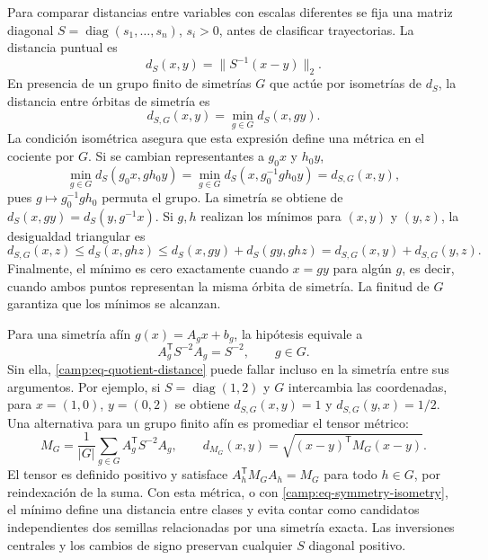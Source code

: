 Para comparar distancias entre variables con escalas diferentes se fija una
matriz diagonal \(S=\operatorname{diag}(s_1,\ldots,s_n)\), \(s_i>0\), antes de
clasificar trayectorias. La distancia puntual es
\begin{equation}
 d_S(x,y)=\lVert S^{-1}(x-y)\rVert_2.
 \label{camp:eq-scaled-distance}
\end{equation}
En presencia de un grupo finito de simetrías \(G\) que actúe por isometrías
de \(d_S\), la distancia entre órbitas de simetría es
\begin{equation}
 d_{S,G}(x,y)=\min_{g\in G}d_S(x,g y).
 \label{camp:eq-quotient-distance}
\end{equation}
La condición isométrica asegura que esta expresión define una métrica en el
cociente por \(G\). Si se cambian representantes a \(g_0x\) y \(h_0y\),
\[
 \min_{g\in G}d_S(g_0x,gh_0y)
 =\min_{g\in G}d_S(x,g_0^{-1}gh_0y)=d_{S,G}(x,y),
\]
pues \(g\mapsto g_0^{-1}gh_0\) permuta el grupo. La simetría se obtiene de
\(d_S(x,gy)=d_S(y,g^{-1}x)\). Si \(g,h\) realizan los mínimos para
\((x,y)\) y \((y,z)\), la desigualdad triangular es
\[
 d_{S,G}(x,z)\leq d_S(x,ghz)
 \leq d_S(x,gy)+d_S(gy,ghz)
 =d_{S,G}(x,y)+d_{S,G}(y,z).
\]
Finalmente, el mínimo es cero exactamente cuando \(x=gy\) para algún
\(g\), es decir, cuando ambos puntos representan la misma órbita de simetría.
La finitud de \(G\) garantiza que los mínimos se alcanzan.

Para una simetría afín \(g(x)=A_gx+b_g\), la hipótesis equivale a
\begin{equation}
 A_g^{\mathsf T}S^{-2}A_g=S^{-2},\qquad g\in G.
 \label{camp:eq-symmetry-isometry}
\end{equation}
Sin ella, \cref{camp:eq-quotient-distance} puede fallar incluso en la
simetría entre sus argumentos. Por ejemplo, si \(S=\operatorname{diag}(1,2)\)
y \(G\) intercambia las coordenadas, para \(x=(1,0)\), \(y=(0,2)\) se obtiene
\(d_{S,G}(x,y)=1\) y \(d_{S,G}(y,x)=1/2\). Una alternativa para un grupo
finito afín es promediar el tensor métrico:
\begin{equation}
 M_G=\frac1{|G|}\sum_{g\in G}A_g^{\mathsf T}S^{-2}A_g,
 \qquad d_{M_G}(x,y)=\sqrt{(x-y)^{\mathsf T}M_G(x-y)}.
 \label{camp:eq-symmetry-averaged-metric}
\end{equation}
El tensor es definido positivo y satisface
\(A_h^{\mathsf T}M_GA_h=M_G\) para todo \(h\in G\), por reindexación de la
suma. Con esta métrica, o con \cref{camp:eq-symmetry-isometry}, el mínimo
define una distancia entre clases y evita contar como candidatos independientes
dos semillas relacionadas por una simetría exacta. Las inversiones centrales y
los cambios de signo preservan cualquier \(S\) diagonal positivo.

